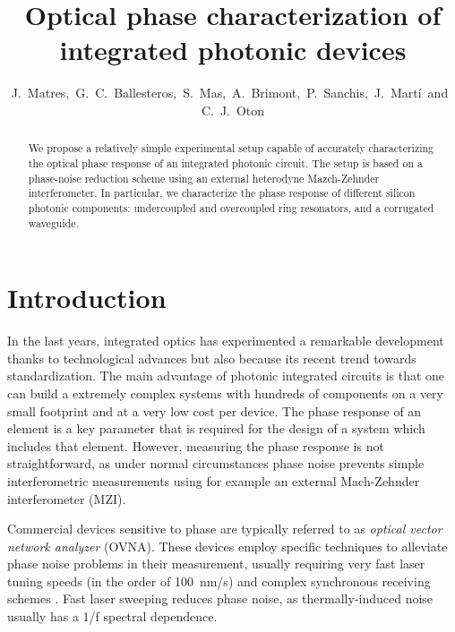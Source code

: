 \documentclass[journal]{IEEEtran}
\begin{document}
\title{Optical phase characterization of integrated photonic devices}
\author{J.~Matres,~G.~C.~Ballesteros,~S.~Mas,~A.~Brimont,~P.~Sanchis,~J.~Mart\'i~and~C.~J.~Oton}

\maketitle


\begin{abstract}
We propose a relatively simple experimental setup capable of accurately characterizing the optical phase response of an integrated photonic circuit. The setup is based on a phase-noise reduction scheme using an external heterodyne Mazch-Zehnder interferometer. In particular, we characterize the phase response of different silicon photonic components: undercoupled and overcoupled ring resonators, and a corrugated waveguide.
\end{abstract}

\section{Introduction}
\noindent In the last years, integrated optics has experimented a remarkable development thanks to technological advances but also because its recent trend towards standardization.
The main advantage of photonic integrated circuits is that one can build a extremely complex systems with hundreds of components on a very small footprint and at a very low cost per device.
The phase response of an element is a key parameter that is required for the design of a system which includes that element. However, measuring the phase response is not straightforward, as under normal circumstances phase noise prevents simple interferometric measurements using for example an external Mach-Zehnder interferometer (MZI).

Commercial devices sensitive to phase are typically referred to as \emph{optical vector network analyzer} (OVNA). These devices employ specific techniques to alleviate phase noise problems in their measurement, usually requiring very fast laser tuning speeds (in the order of 100~nm/s) and complex synchronous receiving schemes \cite{Vanwiggeren2003, Gifford2005}. Fast laser sweeping reduces phase noise, as thermally-induced noise usually has a 1/f spectral dependence.
\end{document}
